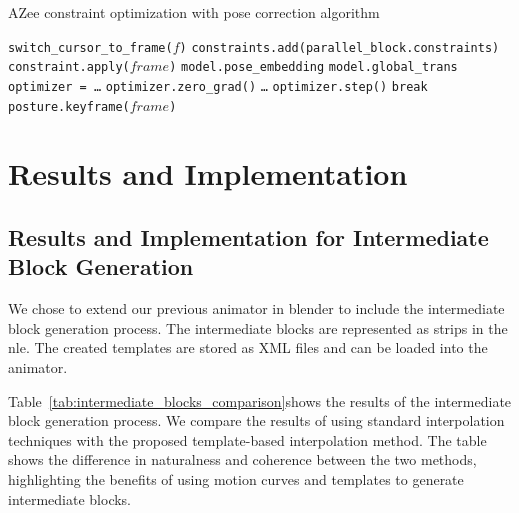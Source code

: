 \documentclass[../../main.tex]{subfiles}
\begin{document}
\begin{algorithm}
  \caption{AZee constraint optimization with pose correction algorithm}
  \label{alg:pose_correction}
  \begin{algorithmic}[1]
      \State \texttt{switch\_cursor\_to\_frame($f$)}
          \State \texttt{constraints.add(parallel\_block.constraints)}
      \EndFor
          \State \texttt{constraint.apply($frame$)}
      \EndFor
      \State \texttt{model.pose\_embedding}
      \State \texttt{model.global\_trans}
      \State \texttt{optimizer = \dots}
          \State \texttt{optimizer.zero\_grad()}
          \State \texttt{\dots}
          \State \texttt{optimizer.step()}
           \State \texttt{break} \EndIf
      \EndFor
      \State \texttt{posture.keyframe($frame$)}
  \EndFor
  \end{algorithmic}
  \end{algorithm}

\section{Results and Implementation}
\label{ch:intermediate_blocks_pose_correction:results}

\subsection{Results and Implementation for Intermediate Block Generation}
\label{ch:intermediate_blocks_pose_correction:results:intermediate_block_generation}

We chose to extend our previous animator in blender to include the intermediate block generation process. The intermediate blocks are represented as strips in the \gls{nle}. The created templates are stored as \gls{XML} files and can be loaded into the animator. 

Table~\ref{tab:intermediate_blocks_comparison}shows the results of the intermediate block generation process. We compare the results of using standard interpolation techniques with the proposed template-based interpolation method. The table shows the difference in naturalness and coherence between the two methods, highlighting the benefits of using motion curves and templates to generate intermediate blocks.
\end{document}
